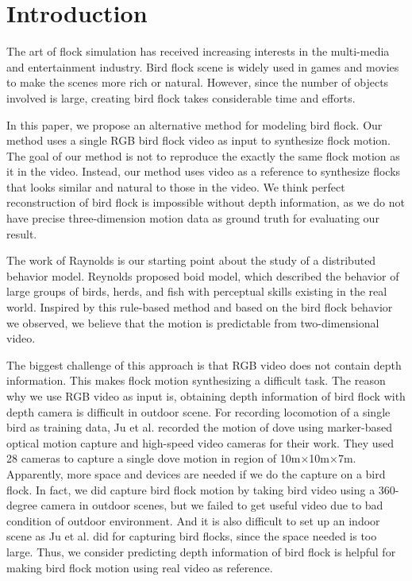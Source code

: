 \chapter{Introduction}


  The art of flock simulation has received increasing interests in the multi-media and entertainment industry. Bird flock scene is widely used in games and movies to make the scenes more rich or natural. However, since the number of objects involved is large, creating bird flock takes considerable time and efforts.


In this paper, we propose an alternative method for modeling bird flock. Our method uses a single RGB bird flock video as input to synthesize flock motion. The goal of our method is not to reproduce the exactly the same flock motion as it in the video. Instead, our method uses video as a reference to synthesize flocks that looks similar and natural to those in the video. We think perfect reconstruction of bird flock is impossible without depth information, as we do not have precise three-dimension motion data as ground truth for evaluating our result.


The work of Raynolds \cite{Boid} is our starting point about the study of a distributed behavior model. Reynolds proposed boid model, which described the behavior of large groups of birds, herds, and fish with perceptual skills existing in the real world. Inspired by this rule-based method and based on the bird flock behavior we observed, we believe that the motion is predictable from two-dimensional video.


The biggest challenge of this approach is that RGB video does not contain depth information. This makes flock motion synthesizing a difficult task. The reason why we use RGB video as input is, obtaining depth information of bird flock with depth camera is difficult in outdoor scene. For recording locomotion of a single bird as training data, Ju et al.\cite{Flappy} recorded the motion of dove using marker-based optical motion capture and high-speed video cameras for their work. They used 28 cameras to capture a single dove motion in region of 10m×10m×7m. Apparently, more space and devices are needed if we do the capture on a bird flock. In fact, we did capture bird flock motion by taking bird video using a 360-degree camera in outdoor scenes, but we failed to get useful video due to bad condition of outdoor environment. And it is also difficult to set up an indoor scene as Ju et al. did for capturing bird flocks, since the space needed is too large. Thus, we consider predicting depth information of bird flock is helpful for making bird flock motion using real video as reference.


